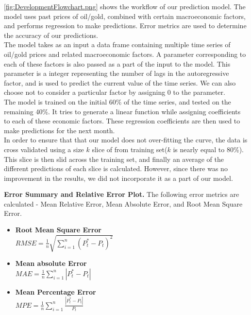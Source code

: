 \documentclass[runningheads]{llncs}
\begin{document}
\noindent \autoref{fig:DevelopmentFlowchart.png} shows the workflow of our prediction model. The model uses past prices of oil/gold, combined with certain macroeconomic factors, and performs regression to make predictions. Error metrics are used to determine the accuracy of our predictions.\\

\noindent The model takes as an input a data frame containing multiple time series of oil/gold prices and related macroeconomic factors. A parameter corresponding to each of these factors is also passed as a part of the input to the model. This parameter is a integer representing the number of lags in the autoregressive factor, and is used to predict the current value of the time series. We can also choose not to consider a particular factor by assigning $0$ to the parameter.\\

\noindent The model is trained on the initial 60\% of the time series, and tested on the remaining 40\%. It tries to generate a linear function while assigning coefficients to each of these economic factors. These regression coefficients are then used to make predictions for the next month. \\

\noindent In order to ensure that that our model does not over-fitting the curve, the data is cross validated using a size $k$ slice of from training set($k$ is nearly equal to 80\%). This slice is then slid across the training set, and finally an average of the different predictions of each slice is calculated. However, since there was no improvement in the results, we did not incorporate it as a part of our model.\\ 

\newpage

\noindent \textbf	{Error Summary and Relative Error Plot.} The following error metrics are calculated - Mean Relative Error, Mean Absolute Error, and Root Mean Square Error. \\

\begin {itemize}
\item\textbf{Root Mean Square Error}\\

$RMSE = \frac{1}{n}\sqrt{\sum\limits_{i=1}^n (P^*_{t} - P_{t})^2}$\\

\item\textbf{Mean absolute Error}\\

$MAE = \frac{1}{n}\sum\limits_{i=1}^n |P^*_{t} - P_{t}|$\\

\item\textbf{Mean Percentage Error}\\

$MPE = \frac{1}{n}\sum\limits_{i=1}^n \frac{|P^*_{t} - P_{t}|}{P_t}$\\

\end {itemize}
\end{document}
